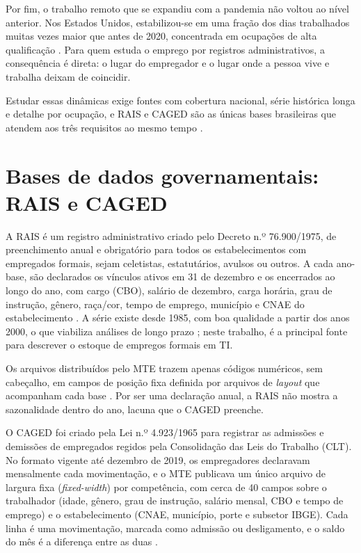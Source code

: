 Por fim, o trabalho remoto que se expandiu com a pandemia não voltou ao nível anterior. Nos Estados Unidos, estabilizou-se em uma fração dos dias trabalhados muitas vezes maior que antes de 2020, concentrada em ocupações de alta qualificação \cite{Barrero2023}. Para quem estuda o emprego por registros administrativos, a consequência é direta: o lugar do empregador e o lugar onde a pessoa vive e trabalha deixam de coincidir.

Estudar essas dinâmicas exige fontes com cobertura nacional, série histórica longa e detalhe por ocupação, e RAIS e CAGED são as únicas bases brasileiras que atendem aos três requisitos ao mesmo tempo \cite{SilvaLima2018}.

\section{Bases de dados governamentais: RAIS e CAGED}

A RAIS é um registro administrativo criado pelo Decreto n.º 76.900/1975, de preenchimento anual e obrigatório para todos os estabelecimentos com empregados formais, sejam celetistas, estatutários, avulsos ou outros. A cada ano-base, são declarados os vínculos ativos em 31 de dezembro e os encerrados ao longo do ano, com cargo (CBO), salário de dezembro, carga horária, grau de instrução, gênero, raça/cor, tempo de emprego, município e CNAE do estabelecimento \cite{RAIS2024}. A série existe desde 1985, com boa qualidade a partir dos anos 2000, o que viabiliza análises de longo prazo \cite{RAIS2024, SilvaLima2018}; neste trabalho, é a principal fonte para descrever o estoque de empregos formais em TI.

Os arquivos distribuídos pelo MTE trazem apenas códigos numéricos, sem cabeçalho, em campos de posição fixa definida por arquivos de \textit{layout} que acompanham cada base \cite{RAIS2024}. Por ser uma declaração anual, a RAIS não mostra a sazonalidade dentro do ano, lacuna que o CAGED preenche.

\label{subsec:caged}

O CAGED foi criado pela Lei n.º 4.923/1965 para registrar as admissões e demissões de empregados regidos pela Consolidação das Leis do Trabalho (CLT). No formato vigente até dezembro de 2019, os empregadores declaravam mensalmente cada movimentação, e o MTE publicava um único arquivo de largura fixa (\textit{fixed-width}) por competência, com cerca de 40 campos sobre o trabalhador (idade, gênero, grau de instrução, salário mensal, CBO e tempo de emprego) e o estabelecimento (CNAE, município, porte e subsetor IBGE). Cada linha é uma movimentação, marcada como admissão ou desligamento, e o saldo do mês é a diferença entre as duas \cite{CAGED2024}.

